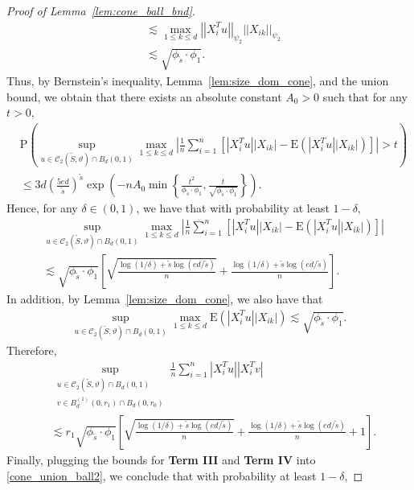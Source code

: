 \documentclass[ejsv2,noshowframe]{imsart}
\theoremstyle{plain}
\theoremstyle{definition}
\theoremstyle{remark}
\newcommand{\norm}[1]{\left|\left| #1 \right|\right|}
\renewcommand{\tilde}{\widetilde}
\begin{document}
\begin{proof}[Proof of Lemma~\ref{lem:cone_ball_bnd}]
\begin{align*}
		&\lesssim \max_{1\leq k \leq d} \norm{X_i^Tu}_{\psi_2} \norm{X_{ik}}_{\psi_2} \\
		&\lesssim \sqrt{\phi_{\tilde{s}} \cdot \phi_1}.
	\end{align*}
	Thus, by Bernstein's inequality, Lemma~\ref{lem:size_dom_cone}, and the union bound, we obtain that there exists an absolute constant $A_0>0$ such that for any $t>0$,
	\begin{align*}
		&\mathrm{P}\left(\sup_{u \in \mathcal{C}_2(\tilde{S},\vartheta) \cap B_d(0,1)} \max_{1\leq k \leq d} \left|\frac{1}{n} \sum_{i=1}^n \left[|X_i^Tu| |X_{ik}| - \mathrm{E}\left(|X_i^Tu| |X_{ik}|\right) \right]\right| > t\right) \\
		&\leq 3d\left(\frac{5ed}{\tilde{s}}\right)^{\tilde{s}} \exp\left(-nA_0 \min\left\{\frac{t^2}{\phi_{\tilde{s}} \cdot \phi_1}, \frac{t}{\sqrt{\phi_{\tilde{s}} \cdot \phi_1}}\right\}\right).
	\end{align*}
	Hence, for any $\delta \in (0,1)$, we have that with probability at least $1-\delta$, 
	\begin{align*}
		&\sup_{u \in \mathcal{C}_2(\tilde{S},\vartheta) \cap B_d(0,1)} \max_{1\leq k \leq d} \left|\frac{1}{n} \sum_{i=1}^n \left[|X_i^Tu| |X_{ik}| - \mathrm{E}\left(|X_i^Tu| |X_{ik}|\right) \right]\right| \\
		&\lesssim \sqrt{\phi_{\tilde{s}} \cdot \phi_1} \left[\sqrt{\frac{\log(1/\delta) + \tilde{s}\log(ed/\tilde{s})}{n}} + \frac{\log(1/\delta)  + \tilde{s}\log(ed/\tilde{s})}{n} \right].
	\end{align*}
	In addition, by Lemma~\ref{lem:size_dom_cone}, we also have that
	\begin{align*}
		\sup_{u \in \mathcal{C}_2(\tilde{S},\vartheta) \cap B_d(0,1)} \max_{1\leq k \leq d} \mathrm{E}\left(|X_i^Tu| |X_{ik}|\right) \lesssim \sqrt{\phi_{\tilde{s}} \cdot \phi_1}.
	\end{align*}
	Therefore, 
	\begin{align*}
		&\sup_{\substack{u \in \mathcal{C}_2(\tilde{S},\vartheta) \cap B_d(0,1)\\v\in B_d^{(1)}(0,r_1) \cap B_d(0,r_0)}} \frac{1}{n} \sum_{i=1}^n \left|X_i^Tu \right| \left|X_i^Tv \right| \\
		&\lesssim r_1 \sqrt{\phi_{\tilde{s}} \cdot \phi_1} \left[\sqrt{\frac{\log(1/\delta) + \tilde{s}\log(ed/\tilde{s})}{n}} + \frac{\log(1/\delta)  + \tilde{s}\log(ed/\tilde{s})}{n} + 1\right].
	\end{align*}
	Finally, plugging the bounds for \textbf{Term III} and \textbf{Term IV} into \eqref{cone_union_ball2}, we conclude that with probability at least $1-\delta$, 

\end{proof}
\end{document}
